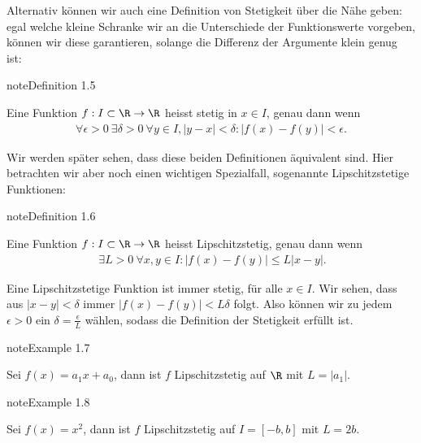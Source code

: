 \documentclass[letterpaper,10pt,english]{jupyterBook}
\begin{document}
Alternativ können wir auch eine Definition von Stetigkeit über die Nähe geben: egal welche kleine Schranke wir an die Unterschiede der Funktionswerte vorgeben, können wir diese garantieren, solange die Differenz der Argumente klein genug ist:
\label{vorkurs/stetigkeit:definition-1}
\begin{sphinxadmonition}{note}{Definition 1.5}



Eine Funktion \(f: I \subset \R \rightarrow \R\) heisst stetig in \(x \in I\), genau dann wenn
\begin{equation*}
\begin{split} \forall \epsilon > 0~\exists \delta > 0 ~\forall y \in I, |y-x| < \delta: |f(x) - f(y)|<\epsilon. \end{split}
\end{equation*}\end{sphinxadmonition}

Wir werden später sehen, dass diese beiden Definitionen äquivalent sind. Hier betrachten wir aber noch einen wichtigen Spezialfall, sogenannte Lipschitz\sphinxhyphen{}stetige Funktionen:
\label{vorkurs/stetigkeit:definition-2}
\begin{sphinxadmonition}{note}{Definition 1.6}



Eine Funktion \(f: I \subset \R \rightarrow \R\) heisst Lipschitz\sphinxhyphen{}stetig, genau dann wenn
\begin{equation*}
\begin{split} \ \exists L > 0 ~\forall x,y \in I: |f(x) - f(y)| \leq L |x-y|.\end{split}
\end{equation*}\end{sphinxadmonition}

Eine Lipschitz\sphinxhyphen{}stetige Funktion ist immer stetig, für alle \(x \in I\). Wir sehen, dass aus \(|x-y| < \delta\) immer \(|f(x) - f(y)| < L \delta\) folgt. Also können wir zu jedem \(\epsilon > 0\) ein \(\delta = \frac{\epsilon}{L}\) wählen, sodass die Definition der Stetigkeit erfüllt ist.
\label{vorkurs/stetigkeit:example-3}
\begin{sphinxadmonition}{note}{Example 1.7}



Sei \(f(x) = a_1 x + a_0\), dann ist \(f\) Lipschitz\sphinxhyphen{}stetig auf \(\R\) mit \(L=\vert a_1 \vert\).
\end{sphinxadmonition}
\label{vorkurs/stetigkeit:example-4}
\begin{sphinxadmonition}{note}{Example 1.8}



Sei \(f(x) = x^2\), dann ist \(f\) Lipschitz\sphinxhyphen{}stetig auf \(I=[-b,b]\) mit \(L= 2b\).
\end{sphinxadmonition}
\end{document}
